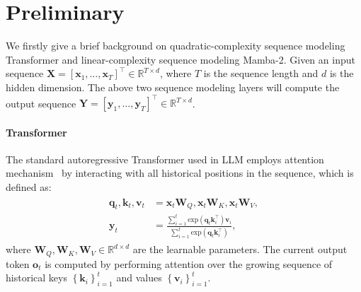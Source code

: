 \section{Preliminary}
\label{sec:preliminary}
We firstly give a brief background on quadratic-complexity sequence modeling Transformer and linear-complexity sequence modeling Mamba-2.
Given an input sequence $\mathbf{X} = \left[\boldsymbol{x}_1,\dots, \boldsymbol{x}_T\right]^\top \in \mathbb{R}^{T \times d}$, where $T$ is the sequence length and $d$ is the hidden dimension. The above two sequence modeling layers will compute the output sequence $\mathbf{Y} = \left[\boldsymbol{y}_1,\dots, \boldsymbol{y}_T\right]^\top \in \mathbb{R}^{T \times d}$.

\paragraph{Transformer}
The standard autoregressive Transformer used in LLM employs attention mechanism~\cite{attention} by interacting with all historical positions in the sequence, which is defined as:
\begin{align}
\begin{split}
    \boldsymbol{q}_t, \boldsymbol{k}_t, \boldsymbol{v}_t &= \boldsymbol{x}_t \boldsymbol{W}_Q, \boldsymbol{x}_t \boldsymbol{W}_K, \boldsymbol{x}_t \boldsymbol{W}_V, \\
    \boldsymbol{y}_t &= \frac{\sum_{i=1}^{t}\text{exp}(\boldsymbol{q}_t\boldsymbol{k}_i^\top)\boldsymbol{v}_i}{\sum_{i=1}^{t}\text{exp}(\boldsymbol{q}_t\boldsymbol{k}_i^\top)},
    \label{eq:attn}
\end{split}
\end{align}
where $\boldsymbol{W}_Q, \boldsymbol{W}_K, \boldsymbol{W}_V \in \mathbb{R}^{d \times d}$ are the learnable parameters. The current output token $\boldsymbol{o}_t$ is computed by performing attention over the growing sequence of historical keys $\left\{\boldsymbol{k}_i\right\}_{i=1}^{t}$ and values $\left\{\boldsymbol{v}_i\right\}_{i=1}^{t}$.

